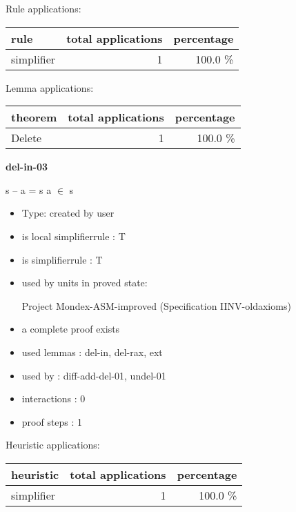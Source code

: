 \documentclass[a4paper]{article}
\begin{document}
Rule applications:

\begin{supertabular}{l|r|r}
rule	        & total applications & percentage \\ \hline
simplifier & 1 & 100.0 \% \\

\end{supertabular}

Lemma applications:

\begin{supertabular}{l|r|r}
theorem	        & total applications & percentage \\ \hline
Delete & 1 & 100.0 \% \\

\end{supertabular}
\pagebreak

{\LARGE\bf del-in-03}\label{lemma-del-in-03}

\medskip

 \Fol s -- a = s \Equiv \Not a $\in$ s

\begin{itemize}

\item Type: created by user

\item is local simplifierrule : T
\item is simplifierrule : T
\item used by units in proved state:

Project Mondex-ASM-improved (Specification IINV-oldaxioms)
\item       a complete proof exists
\item       used lemmas  : del-in, del-rax, ext
\item       used by      : diff-add-del-01, undel-01
\item       interactions : 0
\item       proof steps  : 1
\end{itemize}

\medskip


Heuristic applications:

\begin{supertabular}{l|r|r}
heuristic	& total applications & percentage \\ \hline
simplifier & 1 & 100.0 \% \\

\end{supertabular}
\end{document}
